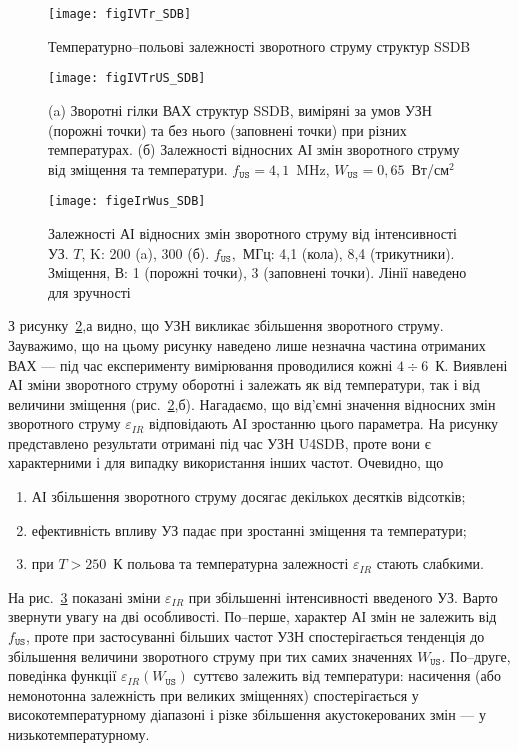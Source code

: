 \begin{figure}
\center
\texttt{[image: figIVTr\_SDB]}
\caption{\label{figIVTr_SDB}
Температурно--польові залежності зворотного струму структур SSDB
}%
\end{figure}

\begin{figure}
\center
\texttt{[image: figIVTrUS\_SDB]}
\caption{\label{figIVTrUS_SDB}
(a) Зворотні гілки ВАХ структур SSDB, виміряні за умов УЗН (порожні точки) та без нього (заповнені точки) при різних температурах.
(б) Залежності відносних АІ змін зворотного струму від зміщення та температури.
$f_\mathtt{US}=4,1$~MHz, $W_\mathtt{US}=0,65$~Вт/см$^2$
}%
\end{figure}

\begin{figure}
\center
\texttt{[image: figeIrWus\_SDB]}
\caption{\label{figeIrWus_SDB}
Залежності АІ відносних змін зворотного струму від інтенсивності УЗ.
$T$, K: 200 (a), 300 (б).
$f_\mathtt{US}$,~МГц: 4,1 (кола), 8,4 (трикутники).
Зміщення, В: 1 (порожні точки), 3 (заповнені точки).
Лінії наведено  для зручності
}%
\end{figure}

З рисунку~\ref{figIVTrUS_SDB},а видно, що УЗН викликає збільшення зворотного струму.
Зауважимо, що на цьому рисунку наведено лише незначна частина отриманих ВАХ ---
під час експерименту вимірювання проводилися кожні $4\div6$~К.
Виявлені АІ зміни зворотного струму оборотні і залежать як від температури, так і від величини зміщення (рис.~\ref{figIVTrUS_SDB},б).
Нагадаємо, що від'ємні значення відносних змін зворотного струму $\varepsilon_{IR}$ відповідають
АІ зростанню цього параметра.
На рисунку представлено результати отримані під час УЗН U4SDB, проте вони є характерними і
для випадку використання інших частот.
Очевидно, що
\begin{enumerate}[label=\asbuk*),leftmargin=0em,itemindent=1.5em]
\item АІ збільшення зворотного струму досягає декількох десятків відсотків;
\item ефективність впливу УЗ падає при зростанні зміщення та температури;
\item при $T>250$~К польова та температурна залежності $\varepsilon_{IR}$ стають слабкими.
\end{enumerate}

На рис.~\ref{figeIrWus_SDB} показані зміни $\varepsilon_{IR}$ при збільшенні інтенсивності введеного УЗ.
Варто звернути увагу на дві особливості.
По--перше, характер АІ змін не залежить від $f_\mathtt{US}$,
проте при застосуванні більших частот УЗН спостерігається тенденція до збільшення величини зворотного струму
при тих самих значеннях $W_\mathtt{US}$.
По--друге, поведінка функції $\varepsilon_{IR}(W_\mathtt{US})$ суттєво залежить від температури:
насичення (або немонотонна залежність при великих зміщеннях) спостерігається у високотемпературному діапазоні
і різке збільшення акустокерованих змін --- у низькотемпературному.





